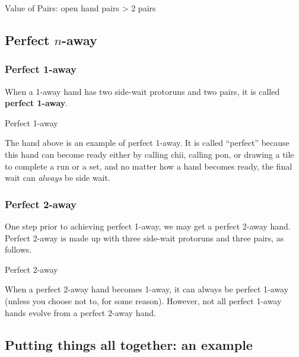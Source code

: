 \bigskip

\begin{itembox}[c]{Value of Pairs: open hand}
 pairs > 2 pairs
\end{itembox}

\bigskip

\subsection{Perfect $n$-away}\label{sec:perfect}

\subsubsection{Perfect 1-away} 
When a 1-away hand has two side-wait protoruns and two pairs, it is called {\bf perfect 1-away}. 
\bigskip
\begin{itembox}[r]{Perfect 1-away}
\bp
{}\bai\bai\bai\\
\ep
\end{itembox}
The hand above is an example of perfect 1-away. It is called ``perfect'' because this hand can become ready either by calling {\jap chii}, calling {\jap pon}, or drawing a tile to complete a run or a set, and no matter how a hand becomes ready, the final wait can \emph{always} be side wait. 

\subsubsection{Perfect 2-away}
One step prior to achieving perfect 1-away, we may get a perfect 2-away hand. Perfect 2-away is made up with three side-wait protoruns and three pairs, as follows.
\bigskip
\begin{itembox}[r]{Perfect 2-away}
\bp
{}\bai\bai\bai\\
\ep
\end{itembox}
When a perfect 2-away hand becomes 1-away, it can always be perfect 1-away (unless you choose not to, for some reason). However, not all perfect 1-away hands evolve from a perfect 2-away hand. 

\newpage
\subsection{Putting things all together: an example}\label{sec:ptat}

